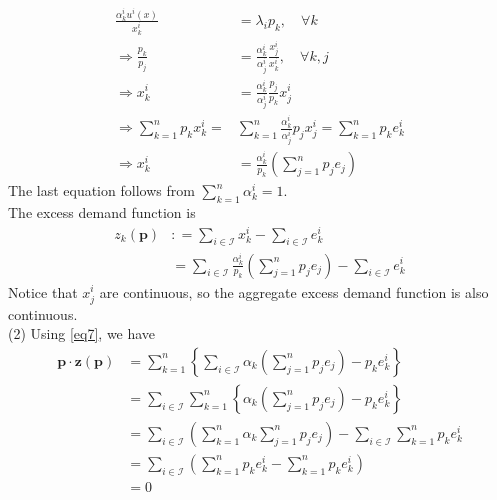 \documentclass[letterpaper,12pt]{article}
\theoremstyle{definition}
\begin{document}
\begin{equation*}
  \begin{aligned}
  \frac { \alpha _ { k }^i  u^i (x)} { x _ { k }^i} & = \lambda_i p _ { k },\quad \forall k\\
\Rightarrow \frac{p_k}{p_j}&= \frac{\alpha_k^i}{\alpha_j^i}\frac{x_j^i}{x_k^i}, \quad \forall k, j\\
\Rightarrow x_k^i &= \frac{\alpha_k^i}{\alpha_j^i}\frac{p_j}{p_k}x_j^i\\
\Rightarrow \sum_{k=1}^{n} p_k x_k^i = &  \sum_{k=1}^{n}\frac{\alpha_k^i}{\alpha_j^i}p_jx_j^i = \sum_{k=1}^{n} p_k e_k^i
\\
 \Rightarrow x_k^i &= \frac{\alpha_k^i}{p_k}\left(\sum _ { j = 1 } ^ { n } p _ { j } e _ { j }\right)
   \end{aligned}
 \end{equation*}
The last equation follows from $\sum _ { k = 1 } ^ { n } \alpha _ { k } ^ { i } = 1$.\\
The excess demand function is 
\begin{equation}\label{eq7}
    \begin{aligned}
    z _ { k } ( \mathbf { p } ) & : = \sum _ { i \in \mathcal { I } } x _ { k } ^ { i } - \sum _ { i \in \mathcal { I } } e _ { k } ^ { i } \\ 
    & = \sum _ { i \in \mathcal { I } } \frac{\alpha _ { k } ^ { i }}{p_k} \left(\sum _ { j = 1 } ^ { n } p _ { j } e _ { j }\right) - \sum _ { i \in \mathcal { I } } e _ { k } ^ { i } 
    \end{aligned}
\end{equation}
Notice that $x_j^i$ are continuous, so the aggregate excess demand function is also continuous.\\
(2) Using \ref{eq7}, we have
\begin{equation}
\begin{aligned}
\mathbf { p } \cdot \mathbf { z } ( \mathbf { p } ) &= \sum_{k=1}^{n} \left\{\sum_{i\in \mathcal{I}}\alpha_k \left(\sum _ { j = 1 } ^ { n } p _ {j} e _ { j }\right) - p_k e _ { k } ^ { i } \right\}\\
&= \sum_{i\in \mathcal{I}}\sum_{k=1}^{n} \left\{\alpha_k \left(\sum _ { j = 1 } ^ { n } p _ { j } e _ { j }\right) - p_k e _ { k } ^ { i } \right\}\\
&= \sum_{i\in \mathcal{I}}\left(\sum_{k=1}^{n} \alpha_k \sum _ { j = 1 } ^ { n } p _ { j } e _ { j }\right) - \sum_{i\in \mathcal{I}}\sum_{k=1}^{n} p_k e _ { k } ^ { i }\\
& = \sum_{i\in \mathcal{I}}\left(\sum_{k=1}^{n}p_k e_k^i - \sum_{k=1}^{n} p_k e _ { k } ^ { i }\right)\\
&= 0
\end{aligned}
\end{equation}
\end{document}
